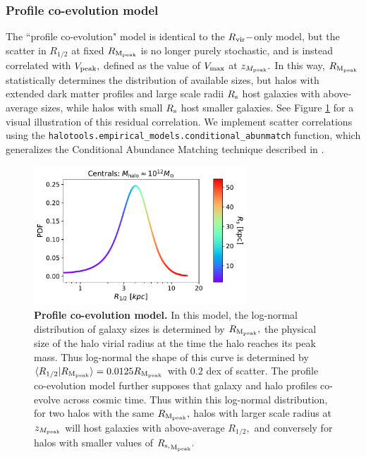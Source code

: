 \documentclass[usenatbib,usegraphicx,letterpaper]{mn2e}
\newcommand{\rhalf}{R_{1/2}}
\newcommand{\zpeak}{z_{M_{\rm peak}}}
\newcommand{\rvir}{R_{\rm vir}}
\newcommand{\rmpeak}{R_{\rm M_{peak}}}
\newcommand{\vmaxmpeak}{V_{\rm peak}}
\newcommand{\vmax}{V_{\rm max}}
\newcommand{\rspeak}{{R_{\rm s,}}_{\rm M_{peak}}}
\begin{document}
\subsubsection{Profile co-evolution model}
\label{subsubsec:coevolutionmodel}

The ``profile co-evolution" model is identical to the $\rvir-$only model, but the scatter in $\rhalf$ at fixed $\rmpeak$ is no longer purely stochastic, and is instead correlated with $\vmaxmpeak,$ defined as the value of $\vmax$ at $\zpeak.$ In this way, $\rmpeak$ statistically determines the distribution of available sizes, but halos with extended dark matter profiles and large scale radii $R_{\rm s}$ host galaxies with above-average sizes, while halos with small $R_{\rm s}$ host smaller galaxies. See Figure \ref{fig:coevolutionmodel} for a visual illustration of this residual correlation. We implement scatter correlations using the {\tt halotools.empirical\_models.conditional\_abunmatch} function, which generalizes the Conditional Abundance Matching technique described in \citet{hearin_etal13b}. 

\begin{figure}
\centering
\includegraphics[width=8cm]{FIGS/rs_correlation_visual.pdf}
\caption{
{\bf Profile co-evolution model.} In this model, the log-normal distribution of galaxy sizes is determined by $\rmpeak,$ the physical size of the halo virial radius at the time the halo reaches its peak mass. Thus log-normal the shape of this curve is determined by $\langle\rhalf\vert\rmpeak\rangle=0.0125\rmpeak$ with $0.2$ dex of scatter. The profile co-evolution model further supposes that galaxy and halo profiles co-evolve across cosmic time. Thus within this log-normal distribution, for two halos with the same $\rmpeak,$ halos with larger scale radius at $\zpeak$ will host galaxies with above-average $\rhalf,$ and conversely for halos with smaller values of $\rspeak.$ 
}
\label{fig:coevolutionmodel}
\end{figure}
\end{document}

